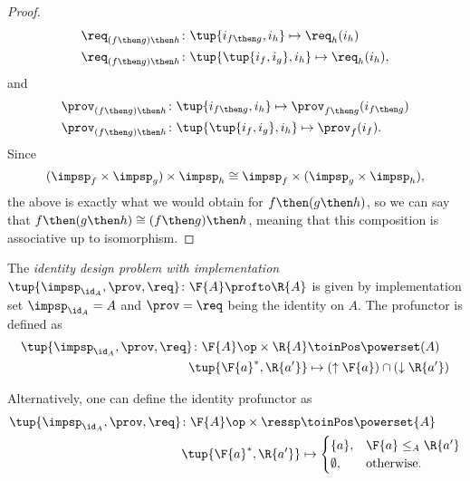 \begin{proof}
\begin{equation}
\begin{aligned}
\req_{(f\then g)\then h}  &\colon  \tup{i_{f\then g},i_h} \mapsto \req_h(i_h) \\
\req_{(f\then g)\then h}  &\colon  \tup{\tup{i_f, i_g},i_h} \mapsto \req_h(i_h),
\end{aligned}
\end{equation}
and
\begin{equation}
\begin{aligned}
\prov_{(f\then g)\then h}  &\colon  \tup{i_{f\then g},i_h} \mapsto \prov_{f\then g}(i_{f\then g})\\
\prov_{(f\then g)\then h}  &\colon  \tup{\tup{i_f, i_g},i_h} \mapsto \prov_f(i_f).
\end{aligned}
\end{equation}
Since
\begin{equation}
(\impsp_f \times \impsp_g) \times \impsp_{h} \cong  \impsp_f \times (\impsp_g \times \impsp_{h}),
\end{equation}
the above is exactly what we would obtain for $f\then (g\then h)$, so we can say
that  $f\then(g\then h)\cong (f\then g)\then h$, meaning that this composition is associative up to isomorphism.
\end{proof}

\begin{definition}
\label{def:identitydpi}
The \emph{identity design problem with implementation} $\tup{\impsp_{\id_A},\prov,\req} \colon \F{A} \profto \R{A}$ is given by implementation set $\impsp_{\id_A} = A$ and $\prov=\req$ being
the identity on $A$. The profunctor is defined as
\begin{equation}
\begin{aligned}
\tup{\impsp_{\id_A},\prov,\req} \colon \F{A}\op \times \R{A} &\toinPos \powerset(A) \\
\tup{\F{a}^*,\R{a'}} &\mapsto (\uparrow \F{a}) \cap (\downarrow \R{a'})
\end{aligned}
\end{equation}
\end{definition}
\begin{remark}
Alternatively, one can define the identity profunctor as
\begin{equation}
\begin{aligned}
\tup{\impsp_{\id_A},\prov,\req}\colon \F{A}\op \times \ressp &\toinPos \powerset{A}\\
\tup{\F{a}^*,\R{a'}}&\mapsto
\begin{cases}
\{a\},&\F{a}\leq_A \R{a'}\\
\emptyset, &\text{otherwise}.
\end{cases}
\end{aligned}
\end{equation}
\end{remark}

